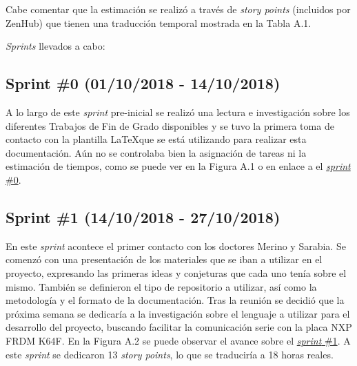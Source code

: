 Cabe comentar que la estimación se realizó a través de \textit{story points} (incluidos por ZenHub) que tienen una traducción temporal mostrada en la Tabla A.1.


\textit{Sprints} llevados a cabo:

\subsection{Sprint \#0 (01/10/2018 - 14/10/2018)}

A lo largo de este \textit{sprint} pre-inicial se realizó una lectura e investigación sobre los diferentes Trabajos de Fin de Grado disponibles  y se tuvo la primera toma de contacto con la plantilla \LaTeX que se está utilizando para realizar esta documentación. Aún no se controlaba bien la asignación de tareas ni la estimación de tiempos, como se puede ver en la Figura A.1 o en enlace a el \href{https://github.com/FranBurgos/TFG/milestone/1?closed=1}{\textit{sprint} \#0}.


\subsection{Sprint \#1 (14/10/2018 - 27/10/2018)}

En este \textit{sprint} acontece el primer contacto con los doctores Merino y Sarabia. Se comenzó con una presentación de los materiales que se iban a utilizar en el proyecto, expresando las primeras ideas y conjeturas que cada uno tenía sobre el mismo. También se definieron el tipo de repositorio a utilizar, así como la metodología y el formato de la documentación. Tras la reunión se decidió que la próxima semana se dedicaría a la investigación sobre el lenguaje a utilizar para el desarrollo del proyecto, buscando facilitar la comunicación serie con la placa NXP FRDM K64F. En la Figura A.2 se puede observar el avance sobre el \href{https://github.com/FranBurgos/TFG/milestone/2?closed=1}{\textit{sprint} \#1}.  A este \textit{sprint} se dedicaron 13 \textit{story points}, lo que se traduciría a 18 horas reales.

